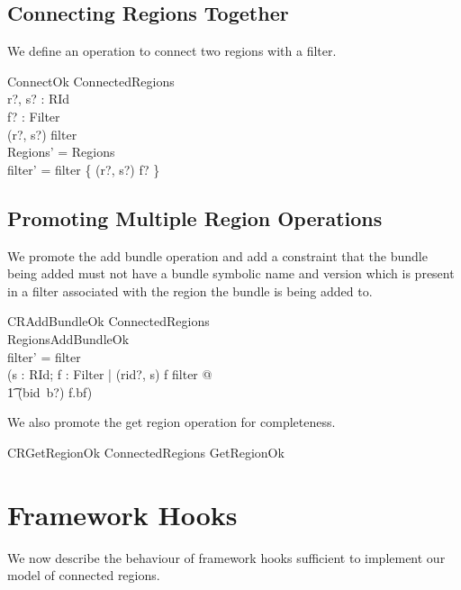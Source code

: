\documentclass[a4paper,9pt]{article}
\begin{document}
\subsection{Connecting Regions Together}

We define an operation to connect two regions with a filter.
\begin{schema}{ConnectOk}
  \Delta ConnectedRegions \\
  r?, s? : RId \\
  f? : Filter \\
\where
  (r?, s?) \notin \dom filter \\
  \theta Regions' = \theta Regions \\
  filter' = filter \cup \{ (r?, s?) \mapsto f? \} \\
\end{schema}

\subsection{Promoting Multiple Region Operations}

We promote the add bundle operation and add a constraint that the bundle being added must not 
have a bundle symbolic name and version which is present in a filter associated with the region
the bundle is being added to.
\begin{schema}{CRAddBundleOk}
  \Delta ConnectedRegions \\
  RegionsAddBundleOk \\
\where
  filter' = filter \\
  (\forall s : RId; f : Filter | (rid?, s) \mapsto f \in filter @ \\
\t1 (bid~b?) \notin f.bf) \\ 
\end{schema}

We also promote the get region operation for completeness.
\begin{zed}
  CRGetRegionOk  \Xi ConnectedRegions \land GetRegionOk \\
\end{zed}

\clearpage
\section{Framework Hooks}
\label{cha:fhooks}

We now describe the behaviour of framework hooks sufficient to implement our model
of connected regions.
\end{document}
